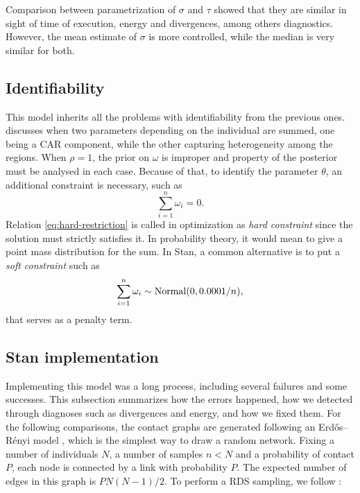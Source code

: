 Comparison between parametrization of $\sigma$ and $\tau$ showed that they are
similar in sight of time of execution, energy and divergences, among others
diagnostics. However, the mean estimate of $\sigma$ is more controlled, while
the median is very similar for both.

\subsection{Identifiability}

This model inherits all the problems with identifiability from the previous
ones. \textcite[p. 3470]{xie2006measures} discusses when two parameters depending on the individual are
summed, one being a CAR component, while the other capturing heterogeneity
among the regions. When $\rho = 1$, the prior on $\omega$ is improper and
property of the posterior must be analysed in each case. Because of that, to
identify the parameter $\theta$, an additional constraint is necessary, such
as
\begin{equation}
  \label{eq:hard-restriction}
  \sum_{i=1}^n \omega_i = 0.
\end{equation}
Relation \eqref{eq:hard-restriction} is called in optimization as {\em hard
    constraint} since the solution must strictly satisfies it. In probability
theory, it would mean to give a point mass distribution for the sum.
In Stan, a common alternative is to put a {\em soft constraint} such as
\begin{equation}
  \label{eq:soft-restriction}
  \sum_{i=1}^n \omega_i \sim \operatorname{Normal}(0, 0.0001/n),
\end{equation}
that serves as a penalty term.

\subsection{Stan implementation}
\label{sec:stan-implementation-rds}

Implementing this model was a long process, including several failures and
some successes. This subsection summarizes how the errors happened, how we
detected through diagnoses such as divergences and energy, and how we fixed
them. For the following comparisons, the contact graphs are generated
following an Erdős–Rényi model \cite{erdos1960evolution}, which is the
simplest way to draw a random network. Fixing a number of individuals $N$,
a number of samples $n < N$ and a probability of contact $P$, each node is
connected by a link with probability $P$. The expected number of edges in this
graph is $PN(N-1)/2$. To perform a RDS sampling, we follow
\textcite[p. 14670]{baraff2016estimating}:

